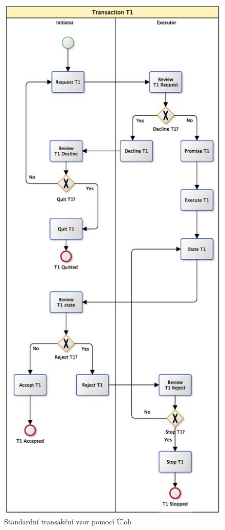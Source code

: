 \documentclass[]{article}
\begin{document}
\begin{figure}[H]\centering
\includegraphics[width=\textwidth,height=\textheight,keepaspectratio]{obrazky/transaction-standard-tasks}
\caption{Standardní transakční vzor pomocí Úloh}
\label{fig:St_trans_ulohy}
\end{figure}
\end{document}
